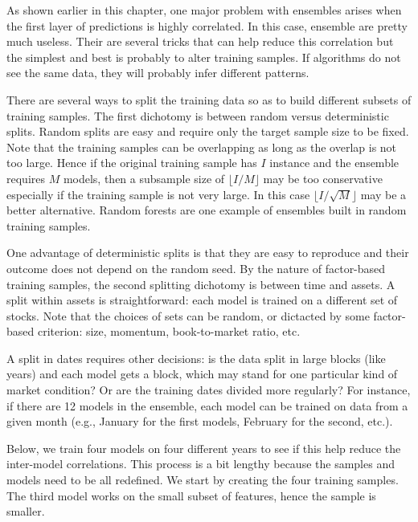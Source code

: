 \documentclass[]{krantz}
\theoremstyle{definition}
\theoremstyle{definition}
\theoremstyle{definition}
\theoremstyle{remark}
\begin{document}
As shown earlier in this chapter, one major problem with ensembles
arises when the first layer of predictions is highly correlated. In this
case, ensemble are pretty much useless. Their are several tricks that
can help reduce this correlation but the simplest and best is probably
to alter training samples. If algorithms do not see the same data, they
will probably infer different patterns.

There are several ways to split the training data so as to build
different subsets of training samples. The first dichotomy is between
random versus deterministic splits. Random splits are easy and require
only the target sample size to be fixed. Note that the training samples
can be overlapping as long as the overlap is not too large. Hence if the
original training sample has \(I\) instance and the ensemble requires
\(M\) models, then a subsample size of \(\lfloor I/M \rfloor\) may be
too conservative especially if the training sample is not very large. In
this case \(\lfloor I/\sqrt{M} \rfloor\) may be a better alternative.
Random forests are one example of ensembles built in random training
samples.

One advantage of deterministic splits is that they are easy to reproduce
and their outcome does not depend on the random seed. By the nature of
factor-based training samples, the second splitting dichotomy is between
time and assets. A split within assets is straightforward: each model is
trained on a different set of stocks. Note that the choices of sets can
be random, or dictacted by some factor-based criterion: size, momentum,
book-to-market ratio, etc.

A split in dates requires other decisions: is the data split in large
blocks (like years) and each model gets a block, which may stand for one
particular kind of market condition? Or are the training dates divided
more regularly? For instance, if there are 12 models in the ensemble,
each model can be trained on data from a given month (e.g., January for
the first models, February for the second, etc.).

Below, we train four models on four different years to see if this help
reduce the inter-model correlations. This process is a bit lengthy
because the samples and models need to be all redefined. We start by
creating the four training samples. The third model works on the small
subset of features, hence the sample is smaller.

\footnotesize
\end{document}
